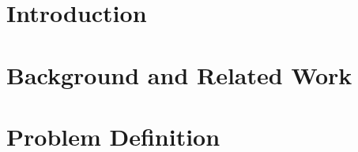 \documentclass[letterpaper,12pt,titlepage,oneside,final]{book}
\begin{document}


\chapter{Introduction}



\chapter{Background and Related Work}



\chapter{Problem Definition}

\end{document}

